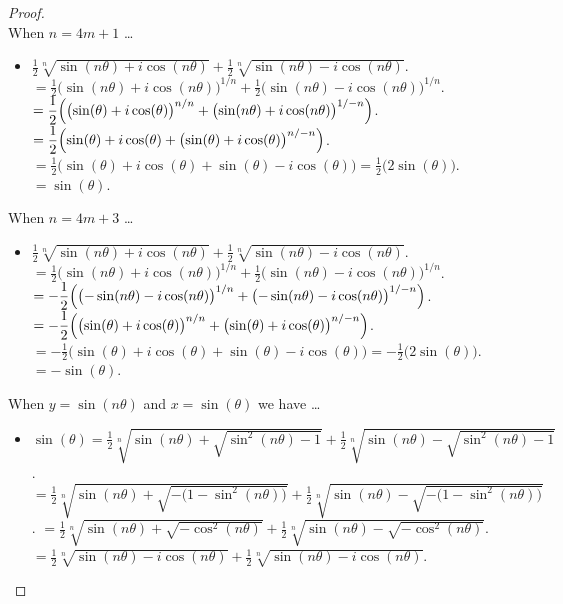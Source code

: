 \documentclass[12pt]{article}
\newcommand{\ds}{\displaystyle}
\theoremstyle{plain}
\begin{document}
\begin{proof}
  \ \\

  When $ n = 4m + 1 $ \dots
  \begin{itemize}
    \item $ \ds \frac{1}{2} \sqrt[n]{\sin(n\theta) + i\cos(n\theta)} + \frac{1}{2} \sqrt[n]{\sin(n\theta) - i\cos(n\theta)} $.
    \subitem $ \ds = \frac{1}{2} \bigl( \sin(n\theta) + i\cos(n\theta) \bigr)^{1/n} + \frac{1}{2} \bigl( \sin(n\theta) - i\cos(n\theta) \bigr)^{1/n} $.
    \subitem $ \ds = \frac{1}{2} \Bigl( \bigl( \sin(\theta) + i\cos(\theta) \bigr)^{n/n} + \bigl( \sin(n\theta) + i\cos(n\theta) \bigr)^{1/-n} \Bigr) $.
    \subitem $ \ds = \frac{1}{2} \Bigl( \sin(\theta) + i\cos(\theta) + \bigl( \sin(\theta) + i\cos(\theta) \bigr)^{n/-n} \Bigr) $.
    \subitem $ \ds = \frac{1}{2} \bigl( \sin(\theta) + i\cos(\theta) + \sin(\theta) - i\cos(\theta) \bigr) = \frac{1}{2} \bigl( 2\sin(\theta) \bigr) $.
    \subitem $ \ds = \sin(\theta) $.
  \end{itemize}

  When $ n = 4m + 3 $ \dots
  \begin{itemize}
    \item $ \ds \frac{1}{2} \sqrt[n]{\sin(n\theta) + i\cos(n\theta)} + \frac{1}{2} \sqrt[n]{\sin(n\theta) - i\cos(n\theta)} $.
    \subitem $ \ds = \frac{1}{2} \bigl( \sin(n\theta) + i\cos(n\theta) \bigr)^{1/n} + \frac{1}{2} \bigl( \sin(n\theta) - i\cos(n\theta) \bigr)^{1/n} $.
    \subitem $ \ds = -\frac{1}{2} \Bigl( \bigl( -\sin(n\theta) - i\cos(n\theta) \bigr)^{1/n} + \bigl( -\sin(n\theta) - i\cos(n\theta) \bigr)^{1/-n} \Bigr) $.
    \subitem $ \ds = -\frac{1}{2} \Bigl( \bigl( \sin(\theta) + i\cos(\theta) \bigr)^{n/n} + \bigl( \sin(\theta) + i\cos(\theta) \bigr)^{n/-n} \Bigr) $.
    \subitem $ \ds = -\frac{1}{2} \bigl( \sin(\theta) + i\cos(\theta) + \sin(\theta) - i\cos(\theta) \bigr) = -\frac{1}{2} \bigl( 2\sin(\theta) \bigr) $.
    \subitem $ \ds = -\sin(\theta) $.
  \end{itemize}

  \newpage

  When $ y = \sin(n\theta) $ and $ x = \sin(\theta) $ we have \dots
  \begin{itemize}
    \item $ \ds \sin(\theta) = \frac{1}{2} \sqrt[n]{ \ds \sin(n\theta) + \sqrt{ \sin^{2}(n\theta) - 1 } } + \frac{1}{2} \sqrt[n]{ \ds \sin(n\theta) - \sqrt{ \sin^{2}(n\theta) - 1 } } $.
    \subitem $ \ds = \frac{1}{2} \sqrt[n]{ \ds \sin(n\theta) + \sqrt{ - \bigl( 1 - \sin^{2}(n\theta) \bigr) } } + \frac{1}{2} \sqrt[n]{ \ds \sin(n\theta) - \sqrt{ - \bigl( 1 - \sin^{2}(n\theta) \bigr) } } $.
    \subitem $ \ds = \frac{1}{2} \sqrt[n]{ \ds \sin(n\theta) + \sqrt{ - \cos^{2}(n\theta) } } + \frac{1}{2} \sqrt[n]{ \ds \sin(n\theta) - \sqrt{ -\cos^{2}(n\theta) } } $.
    \subitem $ \ds = \frac{1}{2} \sqrt[n]{ \ds \sin(n\theta) - i\cos(n\theta) } + \frac{1}{2} \sqrt[n]{ \ds \sin(n\theta) - i\cos(n\theta) } $.
  \end{itemize}


\end{proof}
\end{document}
